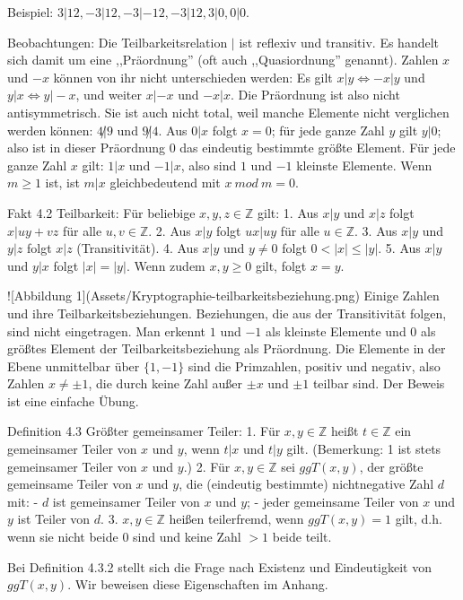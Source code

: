 \documentclass[a4paper]{article}
\begin{document}
\begin{multicols}{3}
Beispiel: $3|12,-3|12,-3|-12,-3|12,3|0,0|0$.

Beobachtungen: Die Teilbarkeitsrelation $|$ ist reflexiv und transitiv. Es handelt sich damit um eine ,,Präordnung'' (oft auch ,,Quasiordnung'' genannt). Zahlen $x$ und $-x$ können von ihr nicht unterschieden werden: Es gilt $x|y\Leftrightarrow -x|y$ und $y|x\Leftrightarrow y|-x$, und weiter $x|-x$ und $-x|x$. Die Präordnung ist also nicht antisymmetrisch. Sie ist auch nicht total, weil manche Elemente nicht verglichen werden können: $4\not|9$ und $9\not|4$. Aus $0|x$ folgt $x=0$; für jede ganze Zahl $y$ gilt $y|0$; also ist in dieser Präordnung $0$ das eindeutig bestimmte größte Element. Für jede ganze Zahl $x$ gilt: $1|x$ und $-1|x$, also sind $1$ und $-1$ kleinste Elemente. Wenn $m\geq 1$ ist, ist $m|x$ gleichbedeutend mit $x\ mod\ m= 0$.

Fakt 4.2 Teilbarkeit: Für beliebige $x,y,z\in\mathbb{Z}$ gilt:
1. Aus $x|y$ und $x|z$ folgt $x|uy+vz$ für alle $u,v\in\mathbb{Z}$.
2. Aus $x|y$ folgt $ux|uy$ für alle $u\in\mathbb{Z}$.
3. Aus $x|y$ und $y|z$ folgt $x|z$ (Transitivität).
4. Aus $x|y$ und $y\not= 0$ folgt $0<|x|\leq |y|$.
5. Aus $x|y$ und $y|x$ folgt $|x|=|y|$. Wenn zudem $x,y\geq 0$ gilt, folgt $x=y$.

![Abbildung 1](Assets/Kryptographie-teilbarkeitsbeziehung.png)
Einige Zahlen und ihre Teilbarkeitsbeziehungen. Beziehungen, die aus der Transitivität folgen, sind nicht eingetragen. Man erkennt $1$ und $-1$ als kleinste Elemente und $0$ als größtes Element der Teilbarkeitsbeziehung als Präordnung. Die Elemente in der Ebene unmittelbar über $\{1,-1\}$ sind die Primzahlen, positiv und negativ, also Zahlen $x\not=\pm 1$, die durch keine Zahl außer $\pm x$ und $\pm 1$ teilbar sind.
Der Beweis ist eine einfache Übung.

Definition 4.3 Größter gemeinsamer Teiler:
1. Für $x,y\in\mathbb{Z}$ heißt $t\in\mathbb{Z}$ ein gemeinsamer Teiler von $x$ und $y$, wenn $t|x$ und $t|y$ gilt. (Bemerkung: 1 ist stets gemeinsamer Teiler von $x$ und $y$.)
2. Für $x,y\in\mathbb{Z}$ sei $ggT(x, y)$, der größte gemeinsame Teiler von $x$ und $y$, die (eindeutig bestimmte) nichtnegative Zahl $d$ mit:
    - $d$ ist gemeinsamer Teiler von $x$ und $y$;
    - jeder gemeinsame Teiler von $x$ und $y$ ist Teiler von $d$.
3. $x,y\in\mathbb{Z}$ heißen teilerfremd, wenn $ggT(x,y)=1$ gilt, d.h. wenn sie nicht beide $0$ sind und keine Zahl $>1$ beide teilt.

Bei Definition 4.3.2 stellt sich die Frage nach Existenz und Eindeutigkeit von $ggT(x,y)$. Wir beweisen diese Eigenschaften im Anhang.


\end{multicols}
\end{document}
